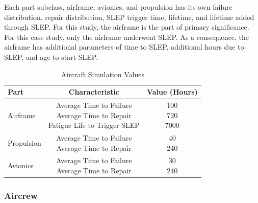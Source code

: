 \documentclass[preprint,12pt]{elsarticle}
\begin{document}
Each part subclass, airframe, avionics, and propulsion has its own
failure distribution, repair distribution, SLEP trigger time,
lifetime, and lifetime added through SLEP. For this study, the
airframe is the part of primary significance. For  this case study,
only the airframe underwent SLEP. As a consequence, the airframe has
additional parameters of time to SLEP, additional  hours due to SLEP,
and age to start SLEP.

\begin{table}[h]
  \caption{Aircraft Simulation Values}
  \label{t:PartSettings}
  \begin{center}
  \begin{tabular}{l c c}
    \hline
    \hline
    \textbf{Part} & \textbf{Characteristic} & \textbf{Value (Hours)} \\
    \hline
    Airframe & \makecell{ Average Time to Failure \\ Average Time to
      Repair \\ Fatigue Life to Trigger SLEP}  &
    \makecell{ 100 \\ 720 \\ 7000} \\
    \hline
    Propulsion & \makecell{ Average Time to Failure \\ Average Time to
      Repair}  &
    \makecell{ 40 \\ 240 \\ } \\
    \hline
    Avionics & \makecell{ Average Time to Failure \\ Average Time to
      Repair}  &
    \makecell{ 30 \\ 240 \\ } \\
    \hline
  \end{tabular}
  \end{center}
\end{table}



\subsubsection{Aircrew}
\end{document}
